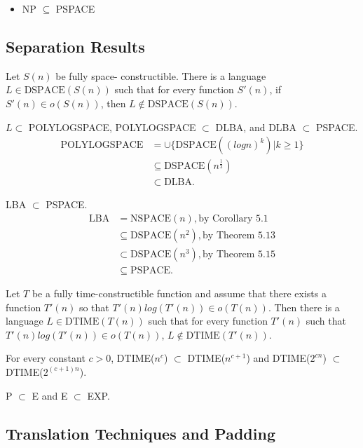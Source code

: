 \begin{itemize}
  \item NP $\subseteq$ PSPACE
\end{itemize}


\subsection{Separation Results}

 Let $S(n)$ be fully space-
constructible. There is a language $L \in \text{DSPACE}(S(n))$ such that for every function
$S'(n)$, if $S'(n) \in o(S(n))$, then $L \notin \text{DSPACE}(S(n))$.

 $L \subset$ POLYLOGSPACE, POLYLOGSPACE $\subset$ DLBA, and DLBA
$\subset$ PSPACE.
\begin{align*}
\text{POLYLOGSPACE} &= \cup \{\text{DSPACE}((logn)^k ) | k \ge 1\}\\
&\subseteq \text{DSPACE}(n^\frac{1}{2})\\
&\subset \text{DLBA}.
\end{align*}

 LBA $\subset$ PSPACE.
\begin{align*}
\text{LBA} &= \text{NSPACE}(n), \text{by Corollary 5.1} \\
& \subseteq \text{DSPACE}(n^2 ), \text{by Theorem 5.13} \\
& \subset \text{DSPACE}(n^3 ), \text{by Theorem 5.15} \\
& \subseteq \text{PSPACE}.
\end{align*}

 Let $T$ be a fully time-constructible
function and assume that there exists a function $T'(n)$ so that
$T'(n)log(T'(n)) \in o(T(n))$.
Then there is a language $L \in \text{DTIME}(T(n))$ such that for every function 
$T'(n)$ such that $T'(n)log(T'(n)) \in o(T(n))$, $L \notin \text{DTIME}(T'(n))$.

 For every constant $c > 0$, DTIME($n^c$) $\subset$ DTIME($n^{c+1}$) and
DTIME($2^{cn}$) $\subset$ DTIME($2^{(c+1)n}$).

 P $\subset$ E and E $\subset$ EXP.

\subsection{Translation Techniques and Padding}

